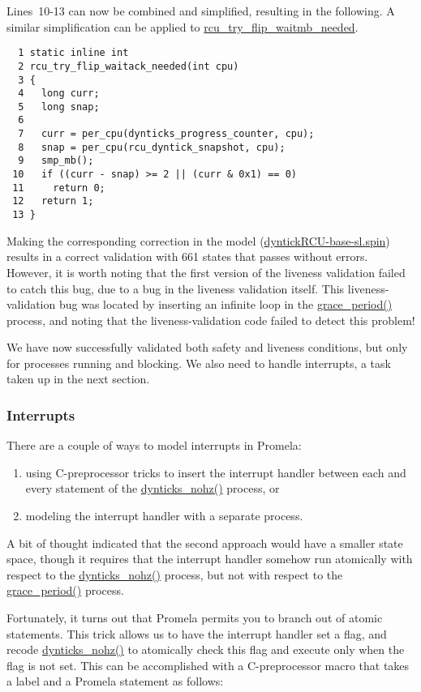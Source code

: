 Lines~10-13 can now be combined and simplified,
resulting in the following.
A similar simplification can be applied to
\url{rcu_try_flip_waitmb_needed}.

{ \scriptsize
\begin{verbatim}
  1 static inline int
  2 rcu_try_flip_waitack_needed(int cpu)
  3 {
  4   long curr;
  5   long snap;
  6 
  7   curr = per_cpu(dynticks_progress_counter, cpu);
  8   snap = per_cpu(rcu_dyntick_snapshot, cpu);
  9   smp_mb();
 10   if ((curr - snap) >= 2 || (curr & 0x1) == 0)
 11     return 0;
 12   return 1;
 13 }
\end{verbatim}
}

Making the corresponding correction in the
model (\url{dyntickRCU-base-sl.spin})
results in a correct validation with 661 states that passes without
errors.
However, it is worth noting that the first version of the liveness
validation failed to catch this bug, due to a bug in the liveness
validation itself.
This liveness-validation bug was located by inserting an infinite
loop in the \url{grace_period()} process, and noting that
the liveness-validation code failed to detect this problem!

We have now successfully validated both safety and liveness
conditions, but only for processes running and blocking.
We also need to handle interrupts, a task taken up in the next section.

\subsubsection{Interrupts}
\label{app:formal:Interrupts}

There are a couple of ways to model interrupts in Promela:
\begin{enumerate}
\item	using C-preprocessor tricks to insert the interrupt handler
	between each and every statement of the \url{dynticks_nohz()}
	process, or
\item	modeling the interrupt handler with a separate process.
\end{enumerate}

A bit of thought indicated that the second approach would have a
smaller state space, though it requires that the interrupt handler
somehow run atomically with respect to the \url{dynticks_nohz()}
process, but not with respect to the \url{grace_period()}
process.

Fortunately, it turns out that Promela permits you to branch
out of atomic statements.
This trick allows us to have the interrupt handler set a flag, and
recode \url{dynticks_nohz()} to atomically check this flag
and execute only when the flag is not set.
This can be accomplished with a C-preprocessor macro that takes
a label and a Promela statement as follows:

